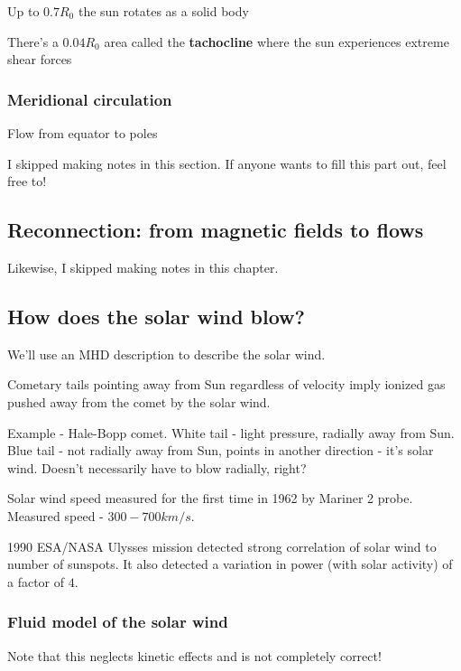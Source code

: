 \documentclass[PlasmaNotes.tex]{subfiles}
\begin{document}
Up to $0.7 R_0$ the sun rotates as a solid body

There's a $0.04R_0$ area called the \textbf{tachocline} where the sun experiences extreme shear forces

\subsubsection{Meridional circulation}
Flow from equator to poles

\begin{center}
I skipped making notes in this section. If anyone wants to fill this part out, feel free to!
\end{center}

\subsection{Reconnection: from magnetic fields to flows}

\begin{center}
Likewise, I skipped making notes in this chapter.
\end{center}

\subsection{How does the solar wind blow?}

We'll use an MHD description to describe the solar wind.

Cometary tails pointing away from Sun regardless of velocity imply ionized gas pushed away from the comet by the solar wind.

Example - Hale-Bopp comet. White tail - light pressure, radially away from Sun. Blue tail - not radially away from Sun, points in another direction - it's solar wind. Doesn't necessarily have to blow radially, right?

Solar wind speed measured for the first time in 1962 by Mariner 2 probe. Measured speed - $300-700 km/s$. 

1990 ESA/NASA Ulysses mission detected strong correlation of solar wind to number of sunspots. It also detected a variation in power (with solar activity) of a factor of $4$.

\subsubsection{Fluid model of the solar wind}

Note that this neglects kinetic effects and is not completely correct!
\end{document}
